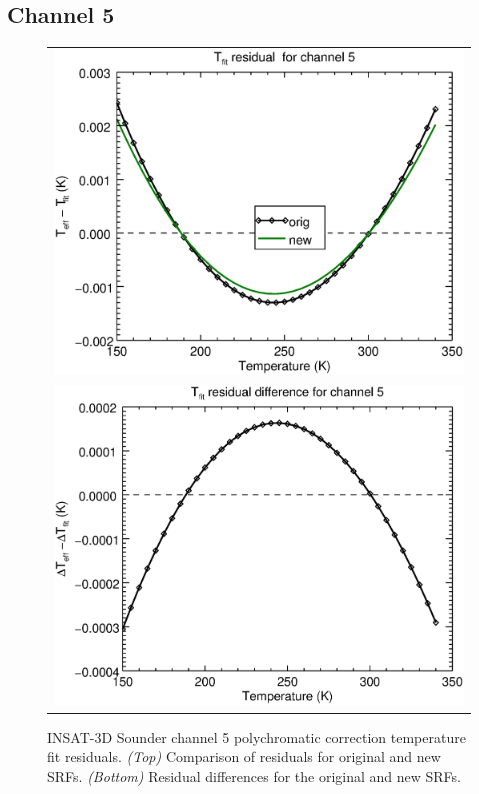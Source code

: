 \subsection{Channel 5}
\begin{figure}[H]
  \centering
  \begin{tabular}{c}
    \includegraphics[scale=0.55]{graphics/sndr/tfit/sndr_insat3d-5.tfit.eps} \\
    \includegraphics[scale=0.55]{graphics/sndr/tfit/sndr_insat3d-5.tfit.difference.eps}
  \end{tabular}
  \caption{INSAT-3D Sounder channel 5 polychromatic correction temperature fit residuals. \emph{(Top)} Comparison of residuals for original and new SRFs. \emph{(Bottom)} Residual differences for the original and new SRFs.}
  \label{fig:sndr_ch5_tfit}
\end{figure}

